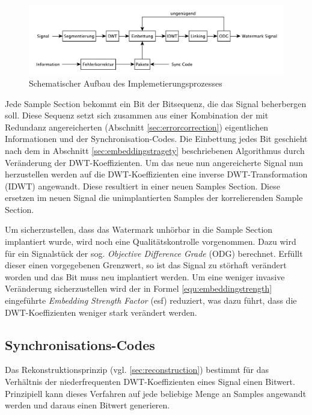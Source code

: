 \begin{figure}[h]
	\centering
	\includegraphics[width=\textwidth]{figures/diagram-encoder-v2.pdf}
	\caption{Schematischer Aufbau des Implemetierungsprozesses}
	\label{fig:diagram-encoder}
\end{figure}

Jede Sample Section bekommt ein Bit der Bitsequenz, die das Signal beherbergen soll. Diese Sequenz setzt sich zusammen aus einer Kombination der mit Redundanz angereicherten (Abschnitt \ref{sec:errorcorrection}) eigentlichen Informationen und der Synchronisation-Codes. Die Einbettung jedes Bit geschieht nach dem in Abschnitt \ref{sec:embeddingstragety} beschriebenen Algorithmus durch Veränderung der DWT-Koeffizienten. Um das neue nun angereicherte Signal nun herzustellen werden auf die DWT-Koeffizienten eine inverse DWT-Transformation (IDWT) angewandt. Diese resultiert in einer neuen Samples Section. Diese ersetzen im neuen Signal die unimplantierten Samples der korrelierenden Sample Section. 

Um sicherzustellen, dass das Watermark unhörbar in die Sample Section implantiert wurde, wird noch eine Qualitätskontrolle vorgenommen. Dazu wird für ein Signalstück der sog. \textit{Objective Difference Grade} (ODG) berechnet. Erfüllt dieser einen vorgegebenen Grenzwert, so ist das Signal zu störhaft verändert worden und das Bit muss neu implantiert werden. Um eine weniger invasive Veränderung sicherzustellen wird der in Formel \ref{equ:embeddingstrength} eingeführte \textit{Embedding Strength Factor} (esf) reduziert, was dazu führt, dass die DWT-Koeffizienten weniger stark verändert werden.

\subsection{Synchronisations-Codes}

Das Rekonstruktionsprinzip (vgl. \ref{sec:reconstruction}) bestimmt für das Verhältnis der niederfrequenten DWT-Koeffizienten eines Signal einen Bitwert. Prinzipiell kann dieses Verfahren auf jede beliebige Menge an Samples angewandt werden und daraus einen Bitwert generieren. 


